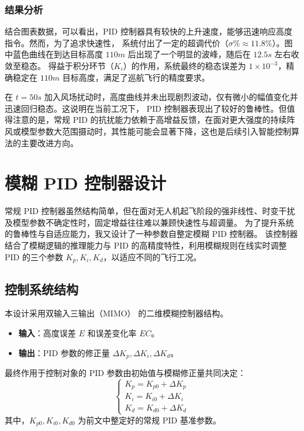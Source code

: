 \documentclass[UTF8, a4paper, 12pt]{ctexart}
\begin{document}
\subsubsection{结果分析}
结合图表数据，可以看出，PID 控制器具有较快的上升速度，能够迅速响应高度指令。然而，为了追求快速性，
系统付出了一定的超调代价（$\sigma\% \approx 11.8\%$）。图中蓝色曲线在到达目标高度 $110m$ 后出现了一个明显的波峰，随后在 $12.5s$ 左右收敛至稳态。
得益于积分环节（$K_i$）的作用，系统最终的稳态误差为 $1 \times 10^{-3}$，精确稳定在 $110m$ 目标高度，满足了巡航飞行的精度要求。

在 $t=50s$ 加入风场扰动时，高度曲线并未出现剧烈波动，仅有微小的幅值变化并迅速回归稳态。这说明在当前工况下，
PID 控制器表现出了较好的鲁棒性。但值得注意的是，常规 PID 的抗扰能力依赖于高增益反馈，在面对更大强度的持续阵风或模型参数大范围摄动时，其性能可能会显著下降，这也是后续引入智能控制算法的主要改进方向。


\section{模糊 PID 控制器设计}

常规 PID 控制器虽然结构简单，但在面对无人机起飞阶段的强非线性、时变干扰及模型参数不确定性时，固定增益往往难以兼顾快速性与超调量。
为了提升系统的鲁棒性与自适应能力，我又设计了一种参数自整定模糊 PID 控制器。
该控制器结合了模糊逻辑的推理能力与 PID 的高精度特性，利用模糊规则在线实时调整 PID 的三个参数 $K_p, K_i, K_d$，以适应不同的飞行工况。

\subsection{控制系统结构}
本设计采用双输入三输出（MIMO） 的二维模糊控制器结构。
\begin{itemize}
    \item \textbf{输入}：高度误差 $E$ 和误差变化率 $EC$。
    \item \textbf{输出}：PID 参数的修正量 $\Delta K_p, \Delta K_i, \Delta K_d$。
\end{itemize}

最终作用于控制对象的 PID 参数由初始值与模糊修正量共同决定：
\begin{equation}
    \begin{cases}
        K_p = K_{p0} + \Delta K_p \\
        K_i = K_{i0} + \Delta K_i \\
        K_d = K_{d0} + \Delta K_d
    \end{cases}
\end{equation}
其中，$K_{p0}, K_{i0}, K_{d0}$ 为前文中整定好的常规 PID 基准参数。
\end{document}
